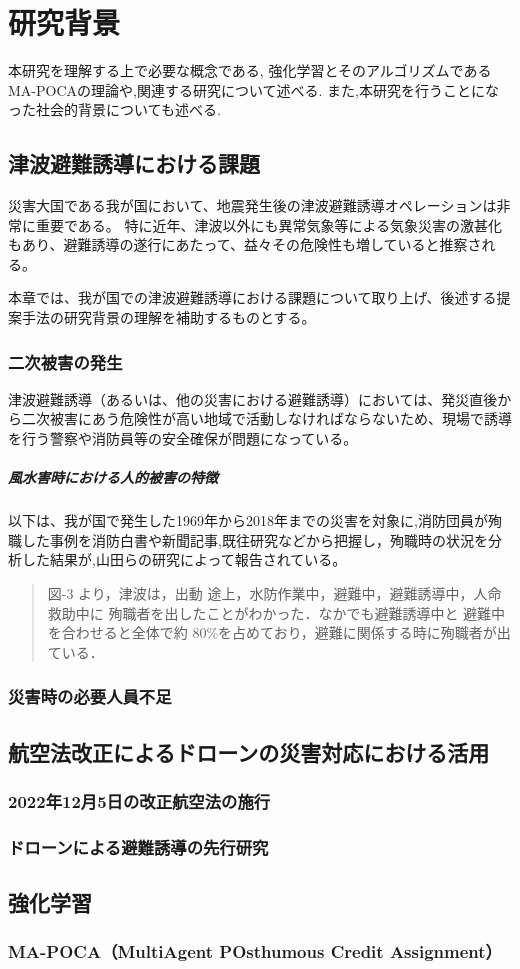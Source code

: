\chapter{研究背景}
本研究を理解する上で必要な概念である, 強化学習とそのアルゴリズムであるMA-POCAの理論や,関連する研究について述べる.
また,本研究を行うことになった社会的背景についても述べる.

\section{津波避難誘導における課題}
災害大国である我が国において、地震発生後の津波避難誘導オペレーションは非常に重要である。
特に近年、津波以外にも異常気象等による気象災害の激甚化もあり、避難誘導の遂行にあたって、益々その危険性も増していると推察される。\par 
本章では、我が国での津波避難誘導における課題について取り上げ、後述する提案手法の研究背景の理解を補助するものとする。
\subsection{二次被害の発生}
津波避難誘導（あるいは、他の災害における避難誘導）においては、発災直後から二次被害にあう危険性が高い地域で活動しなければならないため、現場で誘導を行う警察や消防員等の安全確保が問題になっている。\par
\paragraph{風水害時における人的被害の特徴}
以下は、我が国で発生した1969年から2018年までの災害を対象に,消防団員が殉職した事例を消防白書や新聞記事,既往研究などから把握し，殉職時の状況を分析した結果が,山田らの研究によって報告されている。
\begin{quote}
  図-3 より，津波は，出動 途上，水防作業中，避難中，避難誘導中，人命救助中に 殉職者を出したことがわかった．なかでも避難誘導中と 避難中を合わせると全体で約 80\%を占めており，避難に関係する時に殉職者が出ている．
  
\end{quote}

  \subsection{災害時の必要人員不足}
\section{航空法改正によるドローンの災害対応における活用}
  \subsection{2022年12月5日の改正航空法の施行}
  \subsection{ドローンによる避難誘導の先行研究}
\section{強化学習}
  \subsection{MA-POCA（MultiAgent POsthumous Credit Assignment）}

